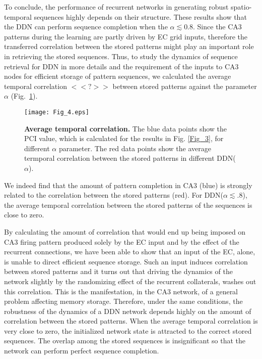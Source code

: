 \documentclass[utf8]{frontiersSCNS} %
\begin{document}
%
To conclude, the performance of recurrent networks in generating robust spatio-temporal sequences highly depends on their structure. These results show that the DDN can perform sequence completion when the $\alpha \lesssim 0.8$. Since the CA3 patterns during the learning are partly driven by EC grid inputs, therefore the transferred correlation between the stored patterns might play an important role in retrieving the stored sequences. 
Thus, to study the dynamics of sequence retrieval for DDN in more details and the requirement of the inputs to CA3 nodes for efficient storage of pattern sequences, we calculated the average temporal correlation $ <<?>>$ between stored patterns against the parameter $\alpha$ (Fig.~\ref{Fig_4}).   

\begin{figure}[!htb]
\centering\texttt{[image: Fig\_4.eps]}
\caption{\textbf{Average temporal correlation.} 
The blue data points show the PCI value, which is calculated for the results in Fig. \ref{Fig_3}, for different $\alpha$ parameter. The red data points show the average termporal correlation between the stored patterns in different DDN($\alpha$).
}
\label{Fig_4}
\end{figure}
We indeed find that the amount of pattern completion in CA3 (blue) is strongly related to the correlation between the stored patterns (red). 
For DDN($\alpha \lesssim .8$), the average temporal correlation between the stored patterns of the sequences is close to zero. 

By calculating the amount of correlation that would end up being imposed on CA3 firing pattern produced solely by the EC input and by the effect of the recurrent connections, we have been able to show that an input of the EC, alone, is unable to direct efficient sequence storage. Such an input induces correlation between stored patterns and it turns out that driving the dynamics of the network slightly by the randomizing effect of the recurrent collaterals, washes out this correlation. This is the manifestation, in the CA3 network, of a general problem affecting memory storage. 
Therefore, under the same conditions, the robustness of the dynamics of a DDN network depends highly on the amount of correlation between the stored patterns. When the average temporal correlation is very close to zero, the initialized network state is attracted to the correct stored sequences. The overlap among the stored sequences is insignificant so that the network can perform perfect sequence completion.
\end{document}
